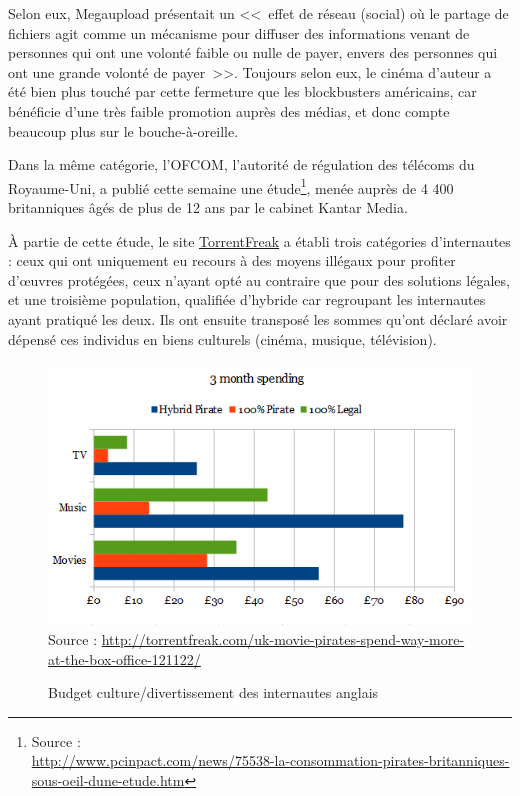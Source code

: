 Selon eux, Megaupload présentait un <<~effet de réseau (social) où le partage de fichiers agit comme un mécanisme pour diffuser des informations venant de personnes qui ont une volonté faible ou nulle de payer, envers des personnes qui ont une grande volonté de payer~>>.
Toujours selon eux, le cinéma d'auteur a été bien plus touché par cette fermeture que les blockbusters américains, car bénéficie d'une très faible promotion auprès des médias, et donc compte beaucoup plus sur le bouche-à-oreille.

Dans la même catégorie, l'OFCOM, l'autorité de régulation des télécoms du Royaume-Uni, a publié cette semaine une étude\footnote{Source :\\\url{http://www.pcinpact.com/news/75538-la-consommation-pirates-britanniques-sous-oeil-dune-etude.htm}}, menée auprès de 4 400 britanniques âgés de plus de 12 ans par le cabinet Kantar Media.

À partie de cette étude, le site \href{http://torrentfreak.com/uk-movie-pirates-spend-way-more-at-the-box-office-121122/}{TorrentFreak} a établi trois catégories d'internautes : ceux qui ont uniquement eu recours à des moyens illégaux pour profiter d'œuvres protégées, ceux n'ayant opté au contraire que pour des solutions légales, et une troisième population, qualifiée d'hybride car regroupant les internautes ayant pratiqué les deux. Ils ont ensuite transposé les sommes qu'ont déclaré avoir dépensé ces individus en biens culturels (cinéma, musique, télévision).

\begin{figure}[H]
\center
\includegraphics[scale=.893]{images/budget-culture.png}
{\footnotesize Source : \url{http://torrentfreak.com/uk-movie-pirates-spend-way-more-at-the-box-office-121122/}}
\caption{Budget culture/divertissement des internautes anglais}
\end{figure}

